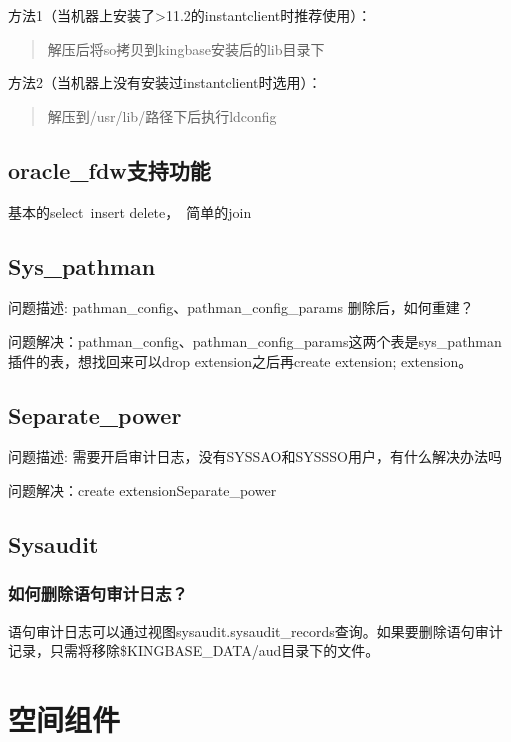 \documentclass[letterpaper,10pt,english]{sphinxmanual}
\begin{document}
方法1（当机器上安装了>11.2的instantclient时推荐使用）：
\begin{quote}

解压后将so拷贝到kingbase安装后的lib目录下
\end{quote}

方法2（当机器上没有安装过instantclient时选用）：
\begin{quote}

解压到/usr/lib/路径下后执行ldconfig
\end{quote}


\section{oracle\_fdw支持功能}
\label{\detokenize{extended-plug-in:id3}}
基本的select insert delete， 简单的join


\section{Sys\_pathman}
\label{\detokenize{extended-plug-in:sys-pathman}}
问题描述: pathman\_config、pathman\_config\_params 删除后，如何重建？

问题解决：pathman\_config、pathman\_config\_params这两个表是sys\_pathman插件的表，想找回来可以drop extension之后再create extension; extension。


\section{Separate\_power}
\label{\detokenize{extended-plug-in:separate-power}}
问题描述: 需要开启审计日志，没有SYSSAO和SYSSSO用户，有什么解决办法吗

问题解决：create extensionSeparate\_power


\section{Sysaudit}
\label{\detokenize{extended-plug-in:sysaudit}}

\subsection{如何删除语句审计日志？}
\label{\detokenize{extended-plug-in:id4}}
语句审计日志可以通过视图sysaudit.sysaudit\_records查询。如果要删除语句审计记录，只需将移除\$KINGBASE\_DATA/aud目录下的文件。


\chapter{空间组件}
\label{\detokenize{gis:id1}}\label{\detokenize{gis::doc}}
\end{document}
